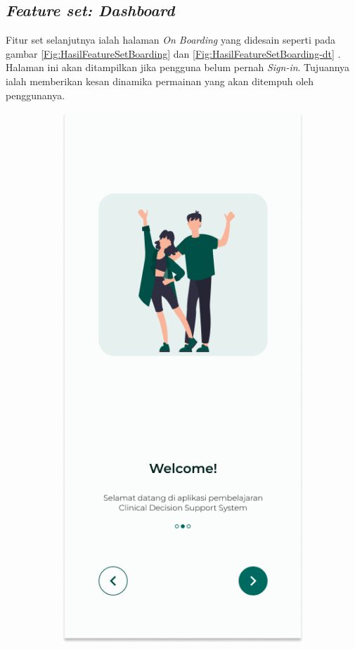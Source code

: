 \subsection{\textit{Feature set: Dashboard}}
Fitur set selanjutnya ialah halaman \textit{On Boarding} yang didesain seperti pada gambar \ref*{Fig:HasilFeatureSetBoarding} dan \ref*{Fig:HasilFeatureSetBoarding-dt} . 
Halaman ini akan ditampilkan jika pengguna belum pernah \textit{Sign-in}. 
Tujuannya ialah memberikan kesan dinamika permainan yang akan ditempuh oleh penggunanya.
\begin{figure}[H]
	\centering
	\begin{subfigure}[b]{0.25\textwidth}
		\centering
	  \includegraphics[width=\linewidth]{contents/chapter-3/images/HF-Boarding-1.png}

\end{subfigure}
\end{figure}
